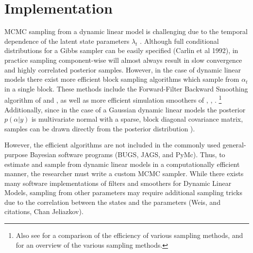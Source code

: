 \documentclass{article}
\DeclareMathOperator{\E}{E}
\begin{document}


%   

\section{Implementation}
\label{sec:implementation}

MCMC sampling from a dynamic linear model is challenging due to the temporal dependence of the latent state parameters $\lambda_{t}$ \parencite{ReisSalazarGamerman2006}.
Although full conditional distributions for a Gibbs sampler can be easily specified (Carlin et al 1992), in practice sampling component-wise will almost always result in slow convergence and highly correlated posterior samples.
However, in the case of dynamic linear models there exist more efficient block sampling algorithms which sample from $\alpha_{t}$ in a single block.
These methods include the Forward-Filter Backward Smoothing algorithm of \textcite{CarterKohn1994} and \textcite{Fruehwirth-Schnatter1994}, as well as more efficient simulation smoothers of \textcite{DeJongShephard1995}, \textcite{DurbinKoopman2002}, \textcite{StricklandTurnerDenhamEtAl2009}.%
\footnote{Also see \textcite{ReisSalazarGamerman2006} for a comparison of the efficiency of various sampling methods, and \textcite{migon2005dynamic} for an overview of the various sampling methods.}
Additionally, since in the case of a Gaussian dynamic linear models the posterior $p(\alpha | y)$ is multivariate normal with a sparse, block diagonal covariance matrix, samples can be drawn directly from the posterior distribution \parencites{migon2005dynamic}{ChanJeliazkov2009}).

However, the efficient algorithms are not included in the commonly used general-purpose Bayesian software programs (BUGS, JAGS, and PyMc).
Thus, to estimate and sample from dynamic linear models in a computationally efficient manner, the researcher must write a custom MCMC sampler.
While there exists many software implementations of filters and smoothers for Dynamic Linear Models, sampling from other parameters may require additional sampling tricks due to the correlation between the states and the parameters (Weis, and citations, Chan Jeliazkov).
\end{document}
